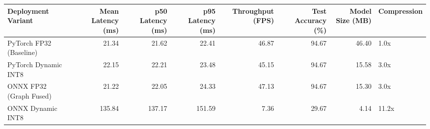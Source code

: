 \begin{tabular}{lrrrrrrl}
\toprule
Deployment Variant & Mean Latency (ms) & p50 Latency (ms) & p95 Latency (ms) & Throughput (FPS) & Test Accuracy (\%) & Model Size (MB) & Compression \\
\midrule
PyTorch FP32 (Baseline) & 21.34 & 21.62 & 22.41 & 46.87 & 94.67 & 46.40 & 1.0x \\
PyTorch Dynamic INT8 & 22.15 & 22.21 & 23.48 & 45.15 & 94.67 & 15.58 & 3.0x \\
ONNX FP32 (Graph Fused) & 21.22 & 22.05 & 24.33 & 47.13 & 94.67 & 15.30 & 3.0x \\
ONNX Dynamic INT8 & 135.84 & 137.17 & 151.59 & 7.36 & 29.67 & 4.14 & 11.2x \\
\bottomrule
\end{tabular}
